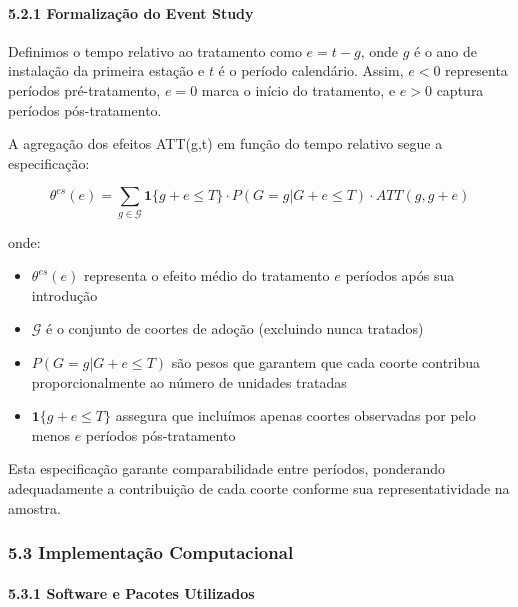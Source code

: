 \documentclass[
  brazilian,
  12pt,
  a4paper,
]{article}
\providecommand{\tightlist}{%
  \setlength{\itemsep}{0pt}\setlength{\parskip}{0pt}}
\begin{document}
\paragraph{\texorpdfstring{\textbf{5.2.1 Formalização do Event
Study}}{5.2.1 Formalização do Event Study}}\label{formalizauxe7uxe3o-do-event-study}

Definimos o tempo relativo ao tratamento como \(e = t - g\), onde \(g\)
é o ano de instalação da primeira estação e \(t\) é o período
calendário. Assim, \(e < 0\) representa períodos pré-tratamento,
\(e = 0\) marca o início do tratamento, e \(e > 0\) captura períodos
pós-tratamento.

A agregação dos efeitos ATT(g,t) em função do tempo relativo segue a
especificação:

\[\theta^{es}(e) = \sum_{g \in \mathcal{G}} \mathbf{1}\{g + e \leq T\} \cdot P(G = g | G + e \leq T) \cdot ATT(g, g+e)\]

onde:

\begin{itemize}
\tightlist
\item
  \(\theta^{es}(e)\) representa o efeito médio do tratamento \(e\)
  períodos após sua introdução
\item
  \(\mathcal{G}\) é o conjunto de coortes de adoção (excluindo nunca
  tratados)
\item
  \(P(G = g | G + e \leq T)\) são pesos que garantem que cada coorte
  contribua proporcionalmente ao número de unidades tratadas
\item
  \(\mathbf{1}\{g + e \leq T\}\) assegura que incluímos apenas coortes
  observadas por pelo menos \(e\) períodos pós-tratamento
\end{itemize}

Esta especificação garante comparabilidade entre períodos, ponderando
adequadamente a contribuição de cada coorte conforme sua
representatividade na amostra.

\subsubsection{\texorpdfstring{\textbf{5.3 Implementação
Computacional}}{5.3 Implementação Computacional}}\label{implementauxe7uxe3o-computacional}

\paragraph{\texorpdfstring{\textbf{5.3.1 Software e Pacotes
Utilizados}}{5.3.1 Software e Pacotes Utilizados}}\label{software-e-pacotes-utilizados}
\end{document}
